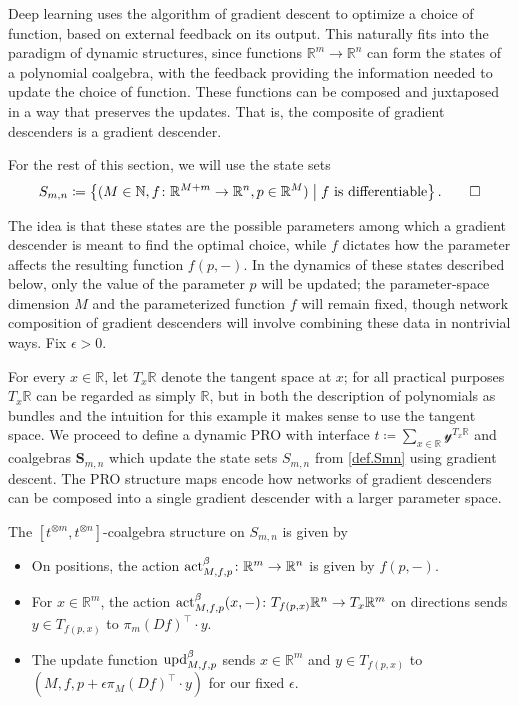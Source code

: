 \documentclass{eptcs}
\theoremstyle{definition}
\theoremstyle{plain}
\newenvironment{definition}
  {\pushQED{\qed}\renewcommand{\qedsymbol}{$\lozenge$}\definitionx}
  {\popQED\enddefinitionx}
\newcommand{\Cat}[1]{\textbf{#1}}%
\newcommand{\tn}[1]{\textnormal{#1}}
\newcommand{\nn}{\mathbb{N}}
\newcommand{\rr}{\mathbb{R}}
\newcommand{\act}{\tn{act}}
\newcommand{\upd}{\tn{upd}}
\newcommand{\yon}{\mathcal{y}}
\newcommand{\0}{\textsf{0}}
\newcommand{\1}{\tn{\textsf{1}}}
\renewcommand{\S}{{\Cat{S}}}
\begin{document}
Deep learning uses the algorithm of gradient descent to optimize a choice of function, based on external feedback on its output. This naturally fits into the paradigm of dynamic structures, since functions $\rr^m \to \rr^n$ can form the states of a polynomial coalgebra, with the feedback providing the information needed to update the choice of function. These functions can be composed and juxtaposed in a way that preserves the updates. That is, the composite of gradient descenders is a gradient descender.

\begin{definition}\label{def.Smn}
For the rest of this section, we will use the state sets 
\[
S_{m,n} \coloneqq \left\{(M \in \nn, f\colon \rr^{M+m} \to \rr^n, p \in \rr^M) \;\middle|\; f \textrm{ is differentiable}\right\}.
\qedhere
\]
\end{definition}

The idea is that these states are the possible parameters among which a gradient descender is meant to find the optimal choice, while $f$ dictates how the parameter affects the resulting function $f(p,-)$. In the dynamics of these states described below, only the value of the parameter $p$ will be updated; the parameter-space dimension $M$ and the parameterized function $f$ will remain fixed, though network composition of gradient descenders will involve combining these data in nontrivial ways. Fix $\epsilon>0$.%

For every $x\in\rr$, let $T_x\rr$ denote the tangent space at $x$; for all practical purposes $T_x \rr$ can be regarded as simply $\rr$, but in both the description of polynomials as bundles and the intuition for this example it makes sense to use the tangent space. We proceed to define a dynamic PRO with interface $t \coloneqq \sum_{x \in \rr} \yon^{T_x \rr}$ and coalgebras $\S_{m,n}$ which update the state sets $S_{m,n}$ from \cref{def.Smn} using gradient descent. The PRO structure maps encode how networks of gradient descenders can be composed into a single gradient descender with a larger parameter space.

\begin{definition}
The $[t^{\otimes m},t^{\otimes n}]$-coalgebra structure on $S_{m,n}$ is given by 
\begin{itemize}
	\item On positions, the action $\act^\beta_{M,f,p}\colon \rr^m \to \rr^n$ is given by $f(p,-)$.
	\item For $x \in \rr^m$, the action $\act^\beta_{M,f,p}(x,-)\colon T_{f(p,x)} \rr^n \to T_x \rr^m$ on directions sends $y\in T_{f(p,x)}$ to $\pi_m (Df)^\top \cdot y$.
	\item The update function $\upd^\beta_{M,f,p}$ sends $x \in \rr^m$ and $y \in T_{f(p,x)}$ to $(M,f,p+\epsilon \pi_M (Df)^\top \cdot y)$ for our fixed $\epsilon$.
	\qedhere
\end{itemize}
\end{definition}
\end{document}
